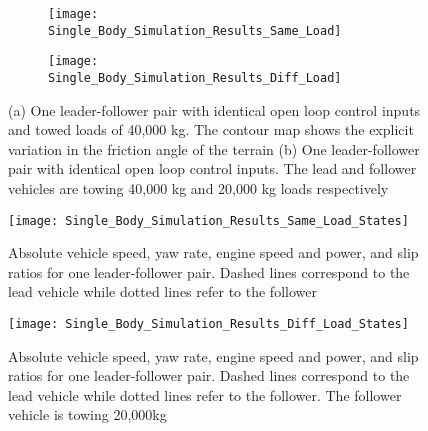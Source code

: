 \begin{figure}[htbp]
\begin{subfigure}{0.5\textwidth}
\texttt{[image: Single\_Body\_Simulation\_Results\_Same\_Load]}
\caption{}
\label{fig:Single_Body_Simulation_Results_Same_Load}
\end{subfigure}
\begin{subfigure}{0.525\textwidth}
\texttt{[image: Single\_Body\_Simulation\_Results\_Diff\_Load]}
\caption{}
\label{fig:Single_Body_Simulation_Results_Diff_Load}
\end{subfigure}
\caption{(a) One leader-follower pair with identical open loop control inputs and towed loads of 40,000 kg. The contour map shows the explicit variation in the friction angle of the terrain (b) One leader-follower pair with identical open loop control inputs. The lead and follower vehicles are towing 40,000 kg and 20,000 kg loads respectively}
\label{fig:RSBD_Plot2D}
\end{figure}

\begin{figure}[htbp]
    \centering
    \texttt{[image: Single\_Body\_Simulation\_Results\_Same\_Load\_States]}
    \caption{Absolute vehicle speed, yaw rate, engine speed and power, and slip ratios for one leader-follower pair. Dashed lines correspond to the lead vehicle while dotted lines refer to the follower}
    \label{fig:Single_Body_Simulation_Results_Same_Load_States}
\end{figure}

\begin{figure}[htbb]
    \centering
    \texttt{[image: Single\_Body\_Simulation\_Results\_Diff\_Load\_States]}
    \caption{Absolute vehicle speed, yaw rate, engine speed and power, and slip ratios for one leader-follower pair. Dashed lines correspond to the lead vehicle while dotted lines refer to the follower. The follower vehicle is towing 20,000kg}
    \label{fig:Single_Body_Simulation_Results_Diff_Load_States}
\end{figure}